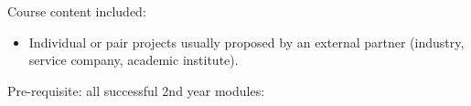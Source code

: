 Course content included:
\begin{itemize}
    \item Individual or pair projects usually proposed by an external partner (industry, service company, academic institute).
\end{itemize}
Pre-requisite: all successful 2nd year modules: